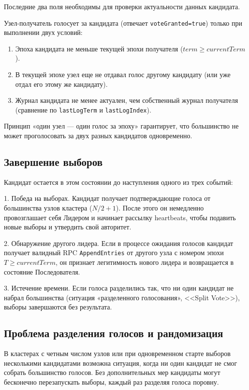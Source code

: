 Последние два поля необходимы для проверки актуальности данных кандидата.

Узел-получатель голосует за кандидата (отвечает \texttt{voteGranted=true}) только при выполнении двух условий:
\begin{enumerate}
    \item Эпоха кандидата не меньше текущей эпохи получателя ($term \ge currentTerm$).
    \item В текущей эпохе узел еще не отдавал голос другому кандидату (или уже отдал его этому же кандидату).
    \item Журнал кандидата не менее актуален, чем собственный журнал получателя (сравнение по \texttt{lastLogTerm} и \texttt{lastLogIndex}).
\end{enumerate}

Принцип «один узел — один голос за эпоху» гарантирует, что большинство не может проголосовать за двух разных кандидатов одновременно.

\subsection{Завершение выборов}

Кандидат остается в этом состоянии до наступления одного из трех событий:

1. Победа на выборах.
Кандидат получает подтверждающие голоса от большинства узлов кластера ($N/2+1$). После этого он немедленно провозглашает себя Лидером и начинает рассылку heartbeats, чтобы подавить новые выборы и утвердить свой авторитет.

2. Обнаружение другого лидера.
Если в процессе ожидания голосов кандидат получает валидный RPC \texttt{AppendEntries} от другого узла с номером эпохи $T \ge currentTerm$, он признает легитимность нового лидера и возвращается в состояние Последователя.

3. Истечение времени.
Если голоса разделились так, что ни один кандидат не набрал большинства (ситуация «разделенного голосования»,  <<Split Vote>>), выборы завершаются без результата.

\subsection{Проблема разделения голосов и рандомизация}

В кластерах с четным числом узлов или при одновременном старте выборов несколькими кандидатами возможна ситуация, когда ни один кандидат не смог собрать большинство голосов. Без дополнительных мер кандидаты могут бесконечно перезапускать выборы, каждый раз разделяя голоса поровну.

